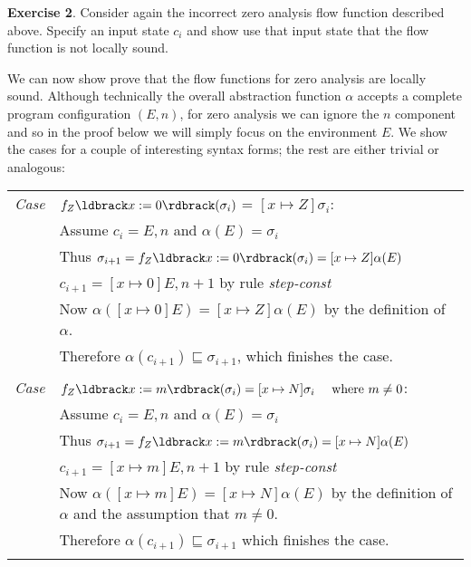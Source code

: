 \documentclass[11pt]{article}
\newcommand{\exercise}[1]
  {\bigskip \noindent
   {\bf Exercise #1}.}
\newcommand{\printanswer}[1]
  {}   %
\newcommand{\answer}[2]
  {\bigskip \printanswer{\noindent
   {\bf Sample Answer #1}. #2 \bigskip}}
\newcommand{\parg}[1] %
  {\ldbrack #1 \rdbrack}
\newcommand{\alap}{\sqsubseteq}
\begin{document}
\exercise{2}  Consider again the incorrect zero analysis flow function described above.  Specify an input state $c_i$ and show use that input state that the flow function is not locally sound.

\answer{2}{TODO}

We can now show prove that the flow functions for zero analysis are locally sound.  Although technically the overall abstraction function $\alpha$ accepts a complete program configuration $(E,n)$, for zero analysis we can ignore the $n$ component and so in the proof below we will simply focus on the environment $E$.  We show the cases for a couple of interesting syntax forms; the rest are either trivial or analogous:\\[1ex]

\begin{tabularx}{\textwidth}{lX}
\emph{Case} & $f_Z\parg{x := 0}(\sigma_{i}) $ = $ [x \mapsto Z]\sigma_i$: \\
 & Assume $c_i = E,n$ and $\alpha(E) = \sigma_i$ \\
 & Thus $\sigma_{i+1} = f_Z\parg{x := 0}(\sigma_i) = [x \mapsto Z]\alpha(E)$ \\ 
 & $c_{i+1} = [x \mapsto 0]E,n+1$ by rule \textit{step-const} \\
 & Now $\alpha([x \mapsto 0]E) = [x \mapsto Z]\alpha(E)$ by the definition of $\alpha$. \\

 &Therefore $\alpha(c_{i+1}) \alap \sigma_{i+1}$, which finishes the case.\\

\\
\emph{Case} & $f_Z\parg{x := m}(\sigma_{i}) = [x \mapsto N]\sigma_i ~~~~ \mbox{where}~ m \neq 0$: \\
 & Assume $c_i = E,n$ and $\alpha(E) = \sigma_i$ \\
 & Thus $\sigma_{i+1} = f_Z\parg{x := m}(\sigma_i) = [x \mapsto N]\alpha(E)$ \\
 &  $c_{i+1} = [x \mapsto m]E,n+1$ by rule \textit{step-const} \\ 
 & Now $\alpha([x \mapsto m]E) = [x \mapsto N]\alpha(E)$ by the definition of $\alpha$ and the assumption that $m \neq 0$. \\
 &  Therefore $\alpha(c_{i+1}) \alap \sigma_{i+1}$ which finishes the case.\\

\\


\end{tabularx}
\end{document}
